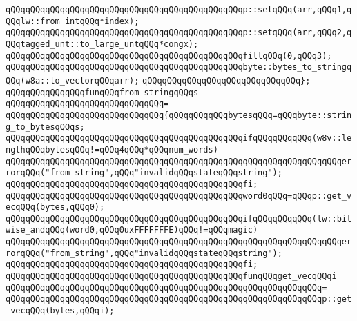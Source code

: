 \verb|qQQqqQQqqQQqqQQqqQQqqQQqqQQqqQQqqQQqqQQqqQQqqQQqp::setqQQq(arr,qQQq1,qQQqlw::from_intqQQq*index);|\newline
\verb|qQQqqQQqqQQqqQQqqQQqqQQqqQQqqQQqqQQqqQQqqQQqqQQqp::setqQQq(arr,qQQq2,qQQqtagged_unt::to_large_untqQQq*congx);|\newline
\verb|qQQqqQQqqQQqqQQqqQQqqQQqqQQqqQQqqQQqqQQqqQQqqQQqfillqQQq(0,qQQq3);|\newline
\verb|qQQqqQQqqQQqqQQqqQQqqQQqqQQqqQQqqQQqqQQqqQQqqQQqbyte::bytes_to_stringqQQq(w8a::to_vectorqQQqarr);|\newline
\verb|qQQqqQQqqQQqqQQqqQQqqQQqqQQqqQQq};|\newline
\newline
\verb|qQQqqQQqqQQqqQQqfunqQQqfrom_stringqQQqs|\newline
\verb|qQQqqQQqqQQqqQQqqQQqqQQqqQQqqQQq=|\newline
\verb|qQQqqQQqqQQqqQQqqQQqqQQqqQQqqQQq{qQQqqQQqqQQqbytesqQQq=qQQqbyte::string_to_bytesqQQqs;|\newline
\newline
\verb|qQQqqQQqqQQqqQQqqQQqqQQqqQQqqQQqqQQqqQQqqQQqqQQqifqQQqqQQqqQQq(w8v::lengthqQQqbytesqQQq!=qQQq4qQQq*qQQqnum_words)|\newline
\verb|qQQqqQQqqQQqqQQqqQQqqQQqqQQqqQQqqQQqqQQqqQQqqQQqqQQqqQQqqQQqqQQqqQQqerrorqQQq("from_string",qQQq"invalidqQQqstateqQQqstring");|\newline
\verb|qQQqqQQqqQQqqQQqqQQqqQQqqQQqqQQqqQQqqQQqqQQqqQQqfi;|\newline
\newline
\verb|qQQqqQQqqQQqqQQqqQQqqQQqqQQqqQQqqQQqqQQqqQQqqQQqword0qQQq=qQQqp::get_vecqQQq(bytes,qQQq0);|\newline
\newline
\verb|qQQqqQQqqQQqqQQqqQQqqQQqqQQqqQQqqQQqqQQqqQQqqQQqifqQQqqQQqqQQq(lw::bitwise_andqQQq(word0,qQQq0uxFFFFFFFE)qQQq!=qQQqmagic)|\newline
\verb|qQQqqQQqqQQqqQQqqQQqqQQqqQQqqQQqqQQqqQQqqQQqqQQqqQQqqQQqqQQqqQQqqQQqerrorqQQq("from_string",qQQq"invalidqQQqstateqQQqstring");|\newline
\verb|qQQqqQQqqQQqqQQqqQQqqQQqqQQqqQQqqQQqqQQqqQQqqQQqfi;|\newline
\newline
\verb|qQQqqQQqqQQqqQQqqQQqqQQqqQQqqQQqqQQqqQQqqQQqqQQqfunqQQqget_vecqQQqi|\newline
\verb|qQQqqQQqqQQqqQQqqQQqqQQqqQQqqQQqqQQqqQQqqQQqqQQqqQQqqQQqqQQqqQQq=|\newline
\verb|qQQqqQQqqQQqqQQqqQQqqQQqqQQqqQQqqQQqqQQqqQQqqQQqqQQqqQQqqQQqqQQqp::get_vecqQQq(bytes,qQQqi);|\newline
